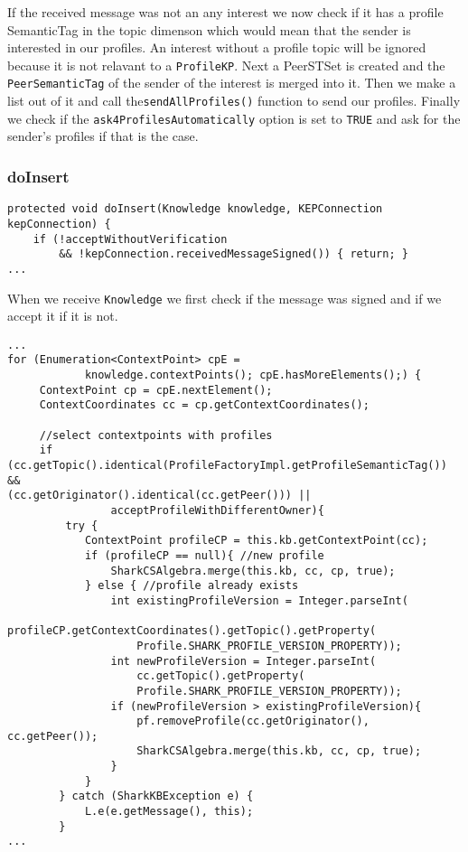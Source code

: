 If the received message was not an any interest we now check if it has a profile SemanticTag in the topic dimenson which would mean that the sender is interested in our profiles. An interest without a profile topic will be ignored because it is not relavant to a {\tt ProfileKP}. Next a PeerSTSet is created and the {\tt PeerSemanticTag} of the sender of the interest is merged into it. Then we make a list out of it and call the{\tt sendAllProfiles()} function to send our profiles. Finally we check if the {\tt ask4ProfilesAutomatically} option is set to {\tt TRUE} and ask for the sender's profiles if that is the case.

\subsubsection{doInsert}

\begin{verbatim}
protected void doInsert(Knowledge knowledge, KEPConnection kepConnection) {
    if (!acceptWithoutVerification 
		&& !kepConnection.receivedMessageSigned()) { return; }
...
\end{verbatim}

When we receive {\tt Knowledge} we first check if the message was signed and if we accept it if it is not.

\begin{verbatim}
...
for (Enumeration<ContextPoint> cpE = 
    		knowledge.contextPoints(); cpE.hasMoreElements();) {
     ContextPoint cp = cpE.nextElement();
     ContextCoordinates cc = cp.getContextCoordinates();

     //select contextpoints with profiles
     if (cc.getTopic().identical(ProfileFactoryImpl.getProfileSemanticTag()) && 						(cc.getOriginator().identical(cc.getPeer())) ||								
        		acceptProfileWithDifferentOwner){
         try {
            ContextPoint profileCP = this.kb.getContextPoint(cc);
            if (profileCP == null){ //new profile
                SharkCSAlgebra.merge(this.kb, cc, cp, true);
            } else { //profile already exists
                int existingProfileVersion = Integer.parseInt(
                	profileCP.getContextCoordinates().getTopic().getProperty(
                	Profile.SHARK_PROFILE_VERSION_PROPERTY));
                int newProfileVersion = Integer.parseInt(
                	cc.getTopic().getProperty(
                	Profile.SHARK_PROFILE_VERSION_PROPERTY));
                if (newProfileVersion > existingProfileVersion){
                    pf.removeProfile(cc.getOriginator(), cc.getPeer());
                    SharkCSAlgebra.merge(this.kb, cc, cp, true);
                }
            }
        } catch (SharkKBException e) {
            L.e(e.getMessage(), this);
        }
...
\end{verbatim}

